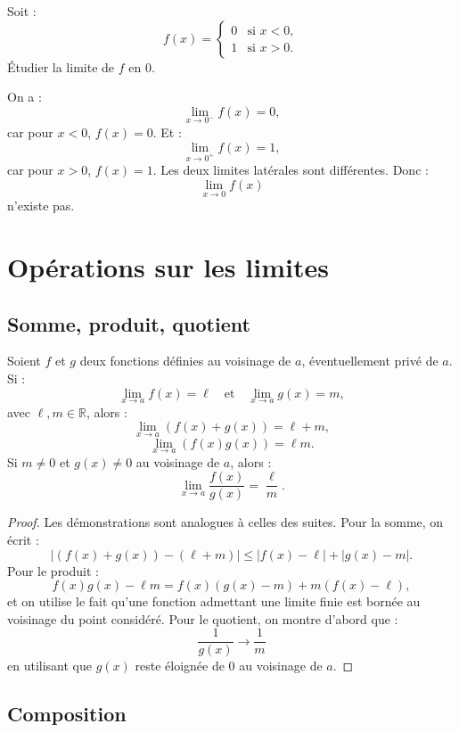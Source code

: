 \documentclass[11pt,a4paper]{article}
\newcommand{\R}{\mathbb R}
\begin{document}
\begin{exercicebox}
Soit :
\[
f(x)=
\begin{cases}
0 & \text{si } x<0,\\
1 & \text{si } x>0.
\end{cases}
\]
Étudier la limite de \(f\) en \(0\).
\end{exercicebox}

\begin{correctionbox}
On a :
\[
\lim_{x\to0^-}f(x)=0,
\]
car pour \(x<0\), \(f(x)=0\).  
Et :
\[
\lim_{x\to0^+}f(x)=1,
\]
car pour \(x>0\), \(f(x)=1\).  
Les deux limites latérales sont différentes.  
Donc :
\[
\lim_{x\to0}f(x)
\]
n'existe pas.
\end{correctionbox}

\section{Opérations sur les limites}

\subsection{Somme, produit, quotient}

\begin{theorembox}
Soient \(f\) et \(g\) deux fonctions définies au voisinage de \(a\), éventuellement privé de \(a\).  
Si :
\[
\lim_{x\to a}f(x)=\ell
\quad\text{et}\quad
\lim_{x\to a}g(x)=m,
\]
avec \(\ell,m\in\R\), alors :
\[
\lim_{x\to a}(f(x)+g(x))=\ell+m,
\]
\[
\lim_{x\to a}(f(x)g(x))=\ell m.
\]
Si \(m\neq0\) et \(g(x)\neq0\) au voisinage de \(a\), alors :
\[
\lim_{x\to a}\frac{f(x)}{g(x)}=\frac{\ell}{m}.
\]
\end{theorembox}

\begin{proof}
Les démonstrations sont analogues à celles des suites.  
Pour la somme, on écrit :
\[
|(f(x)+g(x))-(\ell+m)|
\leq |f(x)-\ell|+|g(x)-m|.
\]
Pour le produit :
\[
f(x)g(x)-\ell m=f(x)(g(x)-m)+m(f(x)-\ell),
\]
et on utilise le fait qu'une fonction admettant une limite finie est bornée au voisinage du point considéré.  
Pour le quotient, on montre d'abord que :
\[
\frac1{g(x)}\to\frac1m
\]
en utilisant que \(g(x)\) reste éloignée de \(0\) au voisinage de \(a\).
\end{proof}

\subsection{Composition}
\end{document}
